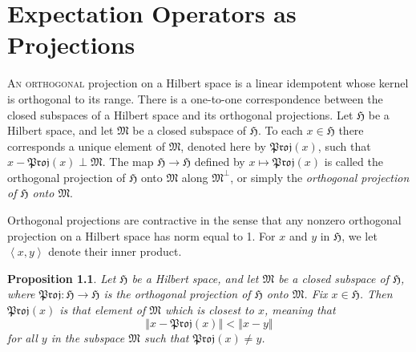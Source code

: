 \documentclass[
twoside=true,
paper=letter,
fontsize=9pt,
pagesize=auto,
leqno,
openany,
headsepline,
overfullrule,
]{scrbook}
\theoremstyle{plain}
\theoremstyle{plain}
\newtheorem{prop}[thm]{Proposition}
\theoremstyle{definition}
\theoremstyle{bfnoteitalic}
\theoremstyle{bfnoteroman}
\newcommand{\norm}[1]{\left\Vert#1\right\Vert}
\begin{document}
\chapter{Expectation Operators as Projections}
%
\newcommand{\proj}{\mathfrak{Proj}}
\newcommand{\projsub}[1]{\mathop{\proj\kern-1pt}\nolimits_#1}
\newcommand{\projgvn}[2]
{\mathop{\proj}\nolimits(#2,#1)}
\newcommand{\raum}[1]{\mathfrak{#1}}
\newcommand{\inner}[2]{\left\langle#1,#2\right\rangle}
\newcommand{\hilbertspace}{\mathfrak{H}}
\newcommand{\hilbertsubspace}{\mathfrak{M}}
\newcommand{\helt}{x}
\newcommand{\heltii}{y}
\newcommand{\hortho}{e_1}
\newcommand{\horthoii}{e_2}
\newcommand{\horthoi}{e_i}
\newcommand{\horthon}{e_n}

\lettrine{A}{n orthogonal} projection on a Hilbert space is a linear idempotent whose kernel is orthogonal to its range.
There is a one-to-one correspondence between the closed subspaces of a Hilbert space and its orthogonal projections.
Let $\hilbertspace$ be a Hilbert space, and let $\hilbertsubspace$ be a closed subspace of $\hilbertspace$. To each $\helt\in\hilbertspace$ there corresponds a unique element of $\hilbertsubspace$, denoted here by
$\proj(\helt)$,  such that
$\helt-\proj(\helt) \perp \hilbertsubspace$.
The map $\hilbertspace \to \hilbertspace$ defined by
$\helt\mapsto \proj(\helt)$ is called the orthogonal projection of
$\hilbertspace$ onto $\hilbertsubspace$ along ${\hilbertsubspace}^\perp$, or simply the
\emph{orthogonal projection of $\hilbertspace$
onto $\hilbertsubspace$}.

Orthogonal projections are contractive in the sense that any nonzero orthogonal projection on a Hilbert space has norm equal to 1.
For $\helt$ and $\heltii$ in $\hilbertspace$, we let
$\inner{\helt}{\heltii}$ denote their inner product.

\begin{prop}
Let $\hilbertspace$ be a Hilbert space, and let $\hilbertsubspace$ be a closed subspace of $\hilbertspace$, where $\proj :\hilbertspace \to \hilbertspace$ is the orthogonal projection of $\hilbertspace$ onto $\hilbertsubspace$. Fix $\helt\in \hilbertspace$. Then $\proj(\helt)$ is that element of $\hilbertsubspace$ which is closest to $\helt$, meaning that
\[
\norm{\helt-\proj(\helt)}<\norm{\helt-\heltii}
\]
for all $\heltii$ in the subspace $\hilbertsubspace$ such that
$\proj(\helt)\neq \heltii$.
\end{prop}
\end{document}
